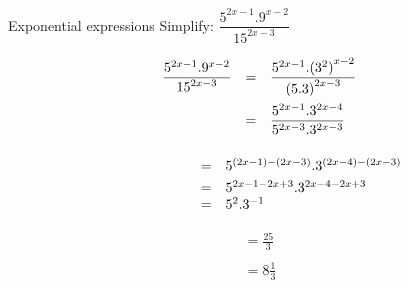      
\begin{wex}
{%
Exponential expressions
}
{
Simplify: $\dfrac{{5}^{2x-1}  .{9}^{x-2}}{{15}^{2x-3}}$
}
{

      
\begin{equation*}
\begin{array}{lcl} \dfrac{{5}^{2x-1}  .{9}^{x-2}}{{15}^{2x-3}}& =& \dfrac{{5}^{2x-1}  .{({3}^{2})}^{x-2}}{{(5.3)}^{2x-3}}\hfill \vspace{5pt}\\
		  & =& \dfrac{{5}^{2x-1}  .{3}^{2x-4}}{{5}^{2x-3}  .{3}^{2x-3}}\hfill 
\end{array}
\end{equation*}

  

\begin{equation*}
\begin{array}{lcl}
\phantom{\dfrac{{5}^{2x-1}  .{9}^{x-2}}{{15}^{2x-3}}}& =& {5}^{(2x-1)-(2x-3)}  .{3}^{(2x-4)-(2x-3)}\hfill \\ 
& =& 5^{2x-1-2x+3} . 3^{2x-4 - 2x+3} \\
& =& {5}^{2}  .{3}^{-1}\hfill \end{array}
\end{equation*}


\begin{eqnarray*}
=\frac{25}{3} \\\\ = 8\frac{1}{3}
\end{eqnarray*}

}
\end{wex}


